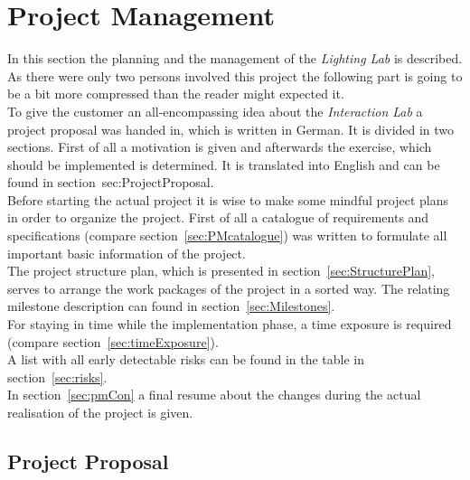 \section{Project Management} \label{sec:pm}
In this section the planning and the management of the \textit{Lighting Lab} is described. As there were only two persons involved this project the following part is going to be a bit more compressed than the reader might expected it.\\
To give the customer an all-encompassing idea about the \textit{Interaction Lab} a project proposal was handed in, which is written in German. It is divided in two sections. First of all a motivation is given and afterwards the exercise, which should be implemented is determined. It is translated into English and can be found in section~{sec:ProjectProposal}. \\ 
Before starting the actual project it is wise to make some mindful project plans in order to organize the project. First of all a catalogue of requirements and specifications (compare section~\ref{sec:PMcatalogue}) was written to formulate all important basic information of the project. \\
The project structure plan, which is presented in section~\ref{sec:StructurePlan}, serves to arrange the work packages of the project in a sorted way. The relating milestone description can found in section~\ref{sec:Milestones}. \\
For staying in time while the implementation phase, a time exposure is required (compare section~\ref{sec:timeExposure}).\\
A list with all early detectable risks can be found in the table in section~\ref{sec:risks}.\\
In section~\ref{sec:pmCon} a final resume about the changes during the actual realisation of the project is given. 


\subsection{Project Proposal}\label{sec:ProjectProposal}

